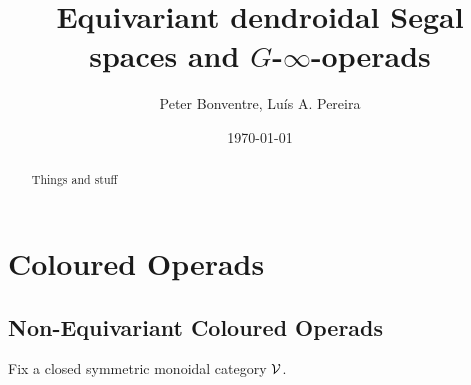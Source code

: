 \documentclass[a4paper,10pt
,draft
]{article}%
\author{Peter Bonventre, Lu\'is A. Pereira}%
\title{Equivariant dendroidal Segal spaces and $G$-$\infty$-operads}%
\date{\today}
\begin{document}
\maketitle

\begin{abstract}
      Things and stuff
\end{abstract}



\tableofcontents


\section{Coloured Operads}


\subsection{Non-Equivariant Coloured Operads}


Fix a closed symmetric monoidal category $\mathcal V$.
\end{document}
